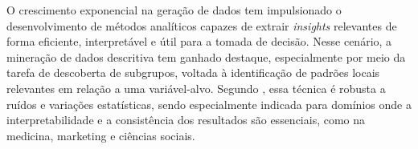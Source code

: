 \documentclass[12pt]{article}
\begin{document}




\hspace{1.2cm}O crescimento exponencial na geração de dados tem impulsionado o desenvolvimento de métodos analíticos capazes de extrair \textit{insights} relevantes de forma eficiente, interpretável e útil para a tomada de decisão. Nesse cenário, a mineração de dados descritiva tem ganhado destaque, especialmente por meio da tarefa de descoberta de subgrupos, voltada à identificação de padrões locais relevantes em relação a uma variável-alvo. Segundo \cite{proenca:22}, essa técnica é robusta a ruídos e variações estatísticas, sendo especialmente indicada para domínios onde a interpretabilidade e a consistência dos resultados são essenciais, como na medicina, marketing e ciências sociais.
\end{document}
